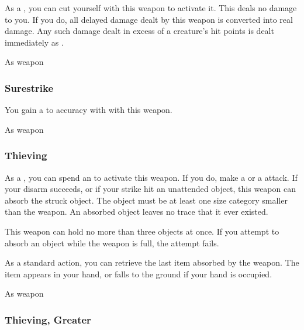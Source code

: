 As a , you can cut yourself with this weapon to activate it.
This deals no damage to you.
If you do, all delayed damage dealt by this weapon is converted into real damage.
Any such damage dealt in excess of a creature's hit points is dealt immediately as .



 As weapon


\lowercase{\hypertarget{item:Surestrike}{}}\label{item:Surestrike}
\hypertarget{item:Surestrike}{\subsubsection{Surestrike\hfill{}}}

You gain a   to accuracy with  with this weapon.



 


 As weapon


\lowercase{\hypertarget{item:Thieving}{}}\label{item:Thieving}
\hypertarget{item:Thieving}{\subsubsection{Thieving\hfill{}}}

As a , you can spend an  to activate this weapon.
If you do, make a  or a  attack.
If your disarm succeeds, or if your strike hit an unattended object, this weapon can absorb the struck object.
The object must be at least one size category smaller than the weapon.
An absorbed object leaves no trace that it ever existed.

This weapon can hold no more than three objects at once.
If you attempt to absorb an object while the weapon is full, the attempt fails.

As a standard action, you can retrieve the last item absorbed by the weapon.
The item appears in your hand, or falls to the ground if your hand is occupied.



 


 As weapon


\lowercase{\hypertarget{item:Thieving, Greater}{}}\label{item:Thieving, Greater}
\hypertarget{item:Thieving, Greater}{\subsubsection{Thieving, Greater\hfill{}}}


